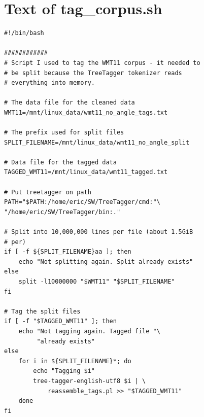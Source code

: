 \documentclass[10pt,letterpaper]{book}
\begin{document}
\section{Text of tag\_corpus.sh}
\label{app:tagcorpus}
\lstset{language=sh}
\begin{lstlisting}
#!/bin/bash

############
# Script I used to tag the WMT11 corpus - it needed to
# be split because the TreeTagger tokenizer reads
# everything into memory.

# The data file for the cleaned data
WMT11=/mnt/linux_data/wmt11_no_angle_tags.txt

# The prefix used for split files
SPLIT_FILENAME=/mnt/linux_data/wmt11_no_angle_split

# Data file for the tagged data
TAGGED_WMT11=/mnt/linux_data/wmt11_tagged.txt

# Put treetagger on path
PATH="$PATH:/home/eric/SW/TreeTagger/cmd:"\
"/home/eric/SW/TreeTagger/bin:."

# Split into 10,000,000 lines per file (about 1.5GiB
# per)
if [ -f ${SPLIT_FILENAME}aa ]; then 
    echo "Not splitting again. Split already exists"
else
    split -l10000000 "$WMT11" "$SPLIT_FILENAME"
fi

# Tag the split files
if [ -f "$TAGGED_WMT11" ]; then 
    echo "Not tagging again. Tagged file "\
         "already exists"
else
    for i in ${SPLIT_FILENAME}*; do
        echo "Tagging $i"
        tree-tagger-english-utf8 $i | \
            reassemble_tags.pl >> "$TAGGED_WMT11"
    done
fi
\end{lstlisting}
\end{document}
